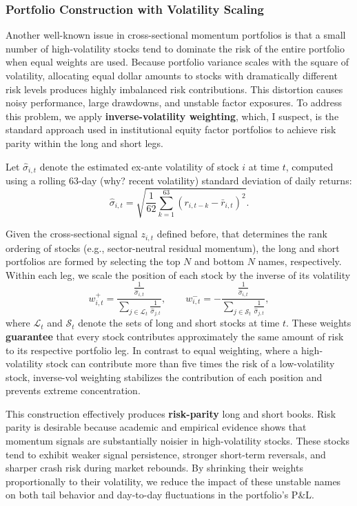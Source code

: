 \documentclass[12pt, a4paper]{article}
\begin{document}
	\subsubsection{Portfolio Construction with Volatility Scaling}
	\label{sec:vol-scaling}
	
	Another well-known issue in cross-sectional momentum portfolios is that a small number of high-volatility stocks tend to dominate the risk of the entire portfolio when equal weights are used. Because portfolio variance scales with the square of volatility, allocating equal dollar amounts to stocks with dramatically different risk levels produces highly imbalanced risk contributions. This distortion causes noisy performance, large drawdowns, and unstable factor exposures. To address this problem, we apply \textbf{inverse-volatility weighting}, which, I suspect, is the standard approach used in institutional equity factor portfolios to achieve risk parity within the long and short legs.
	
	Let $\hat{\sigma}_{i,t}$ denote the estimated ex-ante volatility of stock $i$ at time $t$, computed using a rolling 63-day (why? recent volatility) standard deviation of daily returns:
	\[
	\hat{\sigma}_{i,t} = 
	\sqrt{\frac{1}{62}\sum_{k=1}^{63} 
		\left( r_{i,t-k} - \bar{r}_{i,t} \right)^2 }.
	\]
	
	Given the cross-sectional signal $z_{i,t}$ defined before, that determines the rank ordering of stocks (e.g., sector-neutral residual momentum), the long and short portfolios are formed by selecting the top $N$ and bottom $N$ names, respectively. Within each leg, we scale the position of each stock by the inverse of its volatility
	\[
	w_{i,t}^{+} = \frac{\frac{1}{\hat{\sigma}_{i,t}}}
	{\sum_{j\in\mathcal{L}_t} \frac{1}{\hat{\sigma}_{j,t}}},
	\qquad
	w_{i,t}^{-} = -
	\frac{\frac{1}{\hat{\sigma}_{i,t}}}
	{\sum_{j\in\mathcal{S}_t} \frac{1}{\hat{\sigma}_{j,t}}},
	\]
	where $\mathcal{L}_t$ and $\mathcal{S}_t$ denote the sets of long and short stocks at time $t$. These weights \textbf{guarantee} that every stock contributes approximately the same amount of risk to its respective portfolio leg. In contrast to equal weighting, where a  high-volatility stock can contribute more than five times the risk of a low-volatility stock, inverse-vol weighting stabilizes the contribution of each position and prevents extreme concentration.
	
	This construction effectively produces \textbf{risk-parity} long and short books. 
	Risk parity is desirable because academic and empirical evidence shows that momentum signals are substantially noisier in high-volatility stocks. These stocks tend to exhibit weaker signal persistence, stronger short-term reversals, and sharper crash risk during market rebounds. By shrinking their weights proportionally to their volatility, we reduce the impact of these unstable names on both tail behavior and day-to-day fluctuations in the portfolio's P\&L.
	
\end{document}
